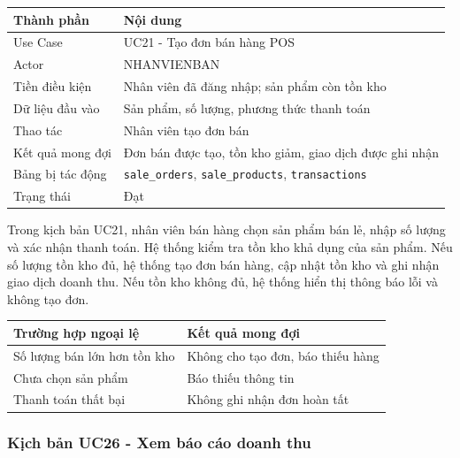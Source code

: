 \begin{table}[H]
	\centering
	\begin{tabularx}{\textwidth}{|l|X|}
		\hline
		\textbf{Thành phần} & \textbf{Nội dung} \\
		\hline
		Use Case & UC21 - Tạo đơn bán hàng POS \\
		\hline
		Actor & NHANVIENBAN \\
		\hline
		Tiền điều kiện & Nhân viên đã đăng nhập; sản phẩm còn tồn kho \\
		\hline
		Dữ liệu đầu vào & Sản phẩm, số lượng, phương thức thanh toán \\
		\hline
		Thao tác & Nhân viên tạo đơn bán \\
		\hline
		Kết quả mong đợi & Đơn bán được tạo, tồn kho giảm, giao dịch được ghi nhận \\
		\hline
		Bảng bị tác động & \texttt{sale\_orders}, \texttt{sale\_products}, \texttt{transactions} \\
		\hline
		Trạng thái & Đạt \\
		\hline
	\end{tabularx}
\end{table}

Trong kịch bản UC21, nhân viên bán hàng chọn sản phẩm bán lẻ, nhập số lượng và xác nhận thanh toán. Hệ thống kiểm tra tồn kho khả dụng của sản phẩm. Nếu số lượng tồn kho đủ, hệ thống tạo đơn bán hàng, cập nhật tồn kho và ghi nhận giao dịch doanh thu. Nếu tồn kho không đủ, hệ thống hiển thị thông báo lỗi và không tạo đơn.

\begin{table}[H]
	\centering
	\begin{tabularx}{\textwidth}{|X|X|}
		\hline
		\textbf{Trường hợp ngoại lệ} & \textbf{Kết quả mong đợi} \\
		\hline
		Số lượng bán lớn hơn tồn kho & Không cho tạo đơn, báo thiếu hàng \\
		\hline
		Chưa chọn sản phẩm & Báo thiếu thông tin \\
		\hline
		Thanh toán thất bại & Không ghi nhận đơn hoàn tất \\
		\hline
	\end{tabularx}
\end{table}

\subsubsection{Kịch bản UC26 - Xem báo cáo doanh thu}

